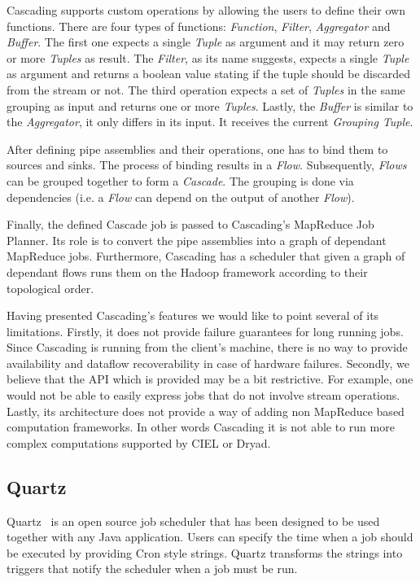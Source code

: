 \documentclass[11pt,a4paper,twoside]{report}
\begin{document}
Cascading supports custom operations by allowing the users to define their own functions. There are four types of functions: \textit{Function}, \textit{Filter}, \textit{Aggregator} and \textit{Buffer}. The first one expects a single \textit{Tuple} as argument and it may return zero or more \textit{Tuples} as result. The \textit{Filter}, as its name suggests, expects a single \textit{Tuple} as argument and returns a boolean value stating if the tuple should be discarded from the stream or not. The third operation expects a set of \textit{Tuples} in the same grouping as input and returns one or more \textit{Tuples}. Lastly, the \textit{Buffer} is similar to the \textit{Aggregator}, it only differs in its input. It receives the current \textit{Grouping Tuple}.


After defining pipe assemblies and their operations, one has to bind them to sources and sinks. The process of binding results in a \textit{Flow}. Subsequently, \textit{Flows} can be grouped together to form a \textit{Cascade}. The grouping is done via dependencies (i.e. a \textit{Flow} can depend on the output of another \textit{Flow}).


Finally, the defined Cascade job is passed to Cascading's MapReduce Job Planner. Its role is to convert the pipe assemblies into a graph of dependant MapReduce jobs. Furthermore, Cascading has a scheduler that given a graph of dependant flows runs them on the Hadoop framework according to their topological order.


Having presented Cascading's features we would like to point several of its limitations. Firstly, it does not provide failure guarantees for long running jobs. Since Cascading is running from the client's machine, there is no way to provide availability and dataflow recoverability in case of hardware failures. Secondly, we believe that the API which is provided may be a bit restrictive. For example, one would not be able to easily express jobs that do not involve stream operations. Lastly, its architecture does not provide a way of adding non MapReduce based computation frameworks. In other words Cascading it is not able to run more complex computations supported by CIEL or Dryad.

\subsection{Quartz}
Quartz~\cite{Quartz} is an open source job scheduler that has been designed to be used together with any Java application. Users can specify the time when a job should be executed by providing Cron style strings. Quartz transforms the strings into triggers that notify the scheduler when a job must be run.
\end{document}

